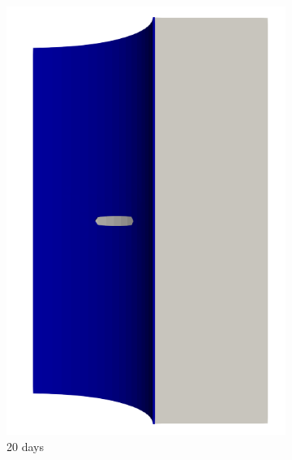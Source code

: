 \begin{figure}[!htb]
  \begin{subfigure}[b]{0.2\textwidth}
    \centering
    \includegraphics[width=\textwidth]{Chapter5/figures/spallation/seed_ep_1}
    \caption{20 days}
  \end{subfigure}
  \begin{subfigure}[b]{0.2\textwidth}
    \centering

\end{subfigure}
\end{figure}
